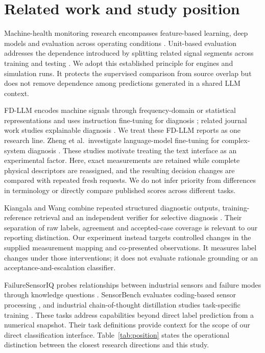 \documentclass[11pt,a4paper]{article}
\begin{document}
\section{Related work and study position}
Machine-health monitoring research encompasses feature-based learning, deep models and evaluation across operating conditions \citep{lei2020applications,zhao2019deep}. Unit-based evaluation addresses the dependence introduced by splitting related signal segments across training and testing \citep{vieira2026realistic}. We adopt this established principle for engines and simulation runs. It protects the supervised comparison from source overlap but does not remove dependence among predictions generated in a shared LLM context.

FD-LLM encodes machine signals through frequency-domain or statistical representations and uses instruction fine-tuning for diagnosis \citep{qaid2024fdllm}; related journal work studies explainable diagnosis \citep{qaid2026explainable}. We treat these FD-LLM reports as one research line. Zheng et al.\ investigate language-model fine-tuning for complex-system diagnosis \citep{zheng2024empirical}. These studies motivate treating the text interface as an experimental factor. Here, exact measurements are retained while complete physical descriptors are reassigned, and the resulting decision changes are compared with repeated fresh requests. We do not infer priority from differences in terminology or directly compare published scores across different tasks.

Kiangala and Wang combine repeated structured diagnostic outputs, training-reference retrieval and an independent verifier for selective diagnosis \citep{kiangala2026verification}. Their separation of raw labels, agreement and accepted-case coverage is relevant to our reporting distinction. Our experiment instead targets controlled changes in the supplied measurement mapping and co-presented observations. It measures label changes under those interventions; it does not evaluate rationale grounding or an acceptance-and-escalation classifier.

FailureSensorIQ probes relationships between industrial sensors and failure modes through knowledge questions \citep{constantinides2025failuresensoriq}. SensorBench evaluates coding-based sensor processing \citep{sensorbench2025}, and industrial chain-of-thought distillation studies task-specific training \citep{lin2025finetuned}. These tasks address capabilities beyond direct label prediction from a numerical snapshot. Their task definitions provide context for the scope of our direct classification interface. Table~\ref{tab:position} states the operational distinction between the closest research directions and this study.
\end{document}

